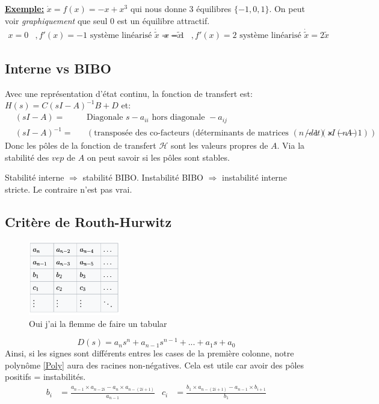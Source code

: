 \documentclass{report}
\begin{document}
\underline{\textbf{Exemple:}} $\dot{x} = f(x) = -x +x^3$ qui nous donne 3 équilibres $\{-1, 0, 1\}$. On peut voir \textit{graphiquement} que seul 0 est un équilibre attractif.
\begin{align*}
x = 0 &, f'(x) = -1 \text{ système linéarisé } \dot{\tilde{x}} = - \tilde{x} & x = 1 &, f'(x) = 2 \text{ système linéarisé } \dot{\tilde{x}} = 2 \tilde{x} 
\end{align*}

\subsection{Interne vs BIBO}
Avec une représentation d'état continu, la fonction de transfert est: $H(s) = C(sI - A)^{-1} B + D$ et:
\begin{align*}
&(sI-A)= & &\text{Diagonale } s-a_{ii} \text{ hors diagonale } -a_{ij}\\
&(sI-A)^{-1}= & & (\text{transposée des co-facteurs (déterminants de matrices }(n-1)\times (n-1))/ det(sI-A)
\end{align*}
Donc les pôles de la fonction de transfert $\mathcal{H}$ sont les valeurs propres de $A$. Via la stabilité des $vep$ de $A$ on peut savoir si les pôles sont stables.\par 
Stabilité interne $\Longrightarrow$ stabilité BIBO. Instabilité BIBO $\Longrightarrow$ instabilité interne stricte. Le contraire n'est pas vrai.\par

\subsection{Critère de Routh-Hurwitz}
\begin{figure}[H]
\centering
\includegraphics[width=4cm]{img/RH.png}
\caption{Oui j'ai la flemme de faire un tabular}
\end{figure}
\begin{equation}
D(s) = a_n s^n +a_{n-1} s^{n-1} + ... + a_1 s + a_0
\label{Poly}
\end{equation} 
Ainsi, si les signes sont différents entres les cases de la première colonne, notre polynôme \ref{Poly} aura des racines non-négatives. Cela est utile car avoir des pôles positifs = instabilités.
\begin{align*}
b_i &=\frac{a_{n-1}\times{a_{n-2i}}-a_n\times{a_{n-(2i+1)}}}{a_{n-1}} & c_i &= \frac{b_1\times{a_{n-(2i+1)}}-a_{n-1}\times{b_{i+1}}}{b_1}
\end{align*}
\end{document}
